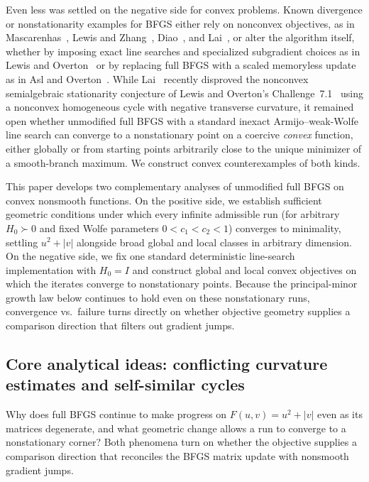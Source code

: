Even less was settled on the negative side for convex problems. Known divergence
or nonstationarity examples for BFGS either rely on nonconvex objectives, as in
Mascarenhas~\cite{NEG_M04,NEG_M07}, Lewis and Zhang~\cite{NEG_LZ15},
Diao~, and Lai~, or alter the
algorithm itself, whether by imposing exact line searches and specialized
subgradient choices as in Lewis and Overton~ or by
replacing full BFGS with a scaled memoryless update as in Asl and
Overton~\cite{NEG_AO21}. While Lai~ recently disproved
the nonconvex semialgebraic stationarity conjecture of Lewis and Overton's
Challenge~7.1~\cite{LO} using a nonconvex homogeneous cycle with negative
transverse curvature, it remained open whether unmodified full BFGS with a
standard inexact Armijo--weak-Wolfe line search can converge to a nonstationary
point on a coercive \emph{convex} function, either globally or from starting
points arbitrarily close to the unique minimizer of a smooth-branch maximum. We
construct convex counterexamples of both kinds.

This paper develops two complementary analyses of unmodified full BFGS on
convex nonsmooth functions. On the positive side, we establish sufficient
geometric conditions under which every infinite admissible run (for arbitrary
$H_0\succ0$ and fixed Wolfe parameters $0<c_1<c_2<1$) converges to minimality,
settling $u^2+|v|$ alongside broad global and local classes in arbitrary
dimension. On the negative side, we fix one standard deterministic line-search
implementation with $H_0=I$ and construct global and local convex objectives on
which the iterates converge to nonstationary points. Because the principal-minor
growth law below continues to hold even on these nonstationary runs,
convergence vs.\ failure turns directly on whether objective geometry supplies a
comparison direction that filters out gradient jumps.

\subsection{Core analytical ideas: conflicting curvature estimates and self-similar cycles}\label{art:geometry}

Why does full BFGS continue to make progress on $F(u,v)=u^2+|v|$ even as its
matrices degenerate, and what geometric change allows a run to converge to a
nonstationary corner? Both phenomena turn on whether the objective supplies a
comparison direction that reconciles the BFGS matrix update with nonsmooth
gradient jumps.

